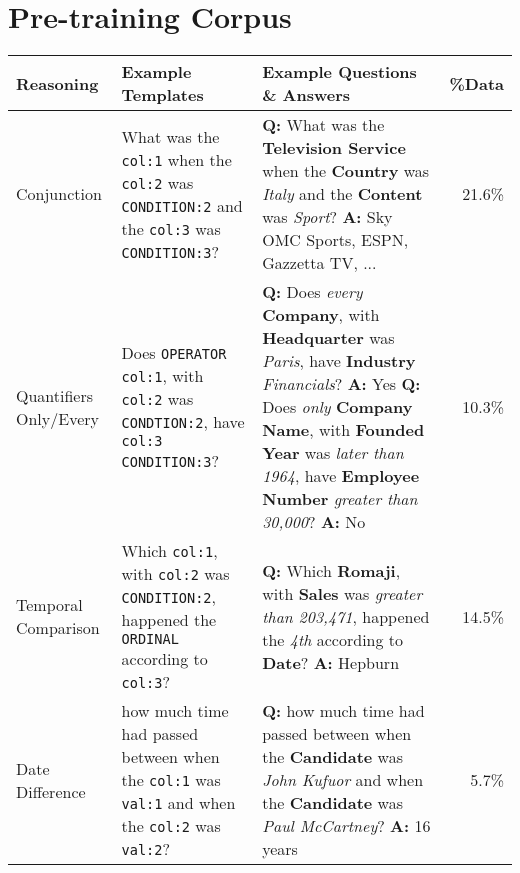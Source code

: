 \documentclass[11pt]{article}
\begin{document}
 \section{Pre-training Corpus}
\newcommand{\qm}{\text{\usefont{OT1}{iwona}{m}{n}?}}

\begin{table*}[!t]
\centering
\small
\begin{tabular}{p{1.4cm}p{5cm}p{6.3cm}r}
\toprule
\textbf{Reasoning}  & 
\textbf{Example Templates} & 
\textbf{Example Questions \& Answers} &
\textbf{\%Data} \\
\midrule
    Conjunction &
    What was the \texttt{col:1} when the \texttt{col:2} was \texttt{CONDITION:2} and the \texttt{col:3} was \texttt{CONDITION:3}? &
    \textbf{Q:} What was the \textbf{Television Service} when the \textbf{Country} was \textit{Italy} and the \textbf{Content} was \textit{Sport}? \newline
    \textbf{A:} Sky OMC Sports, ESPN, Gazzetta TV, ... &
21.6\%
    \\
    \midrule
    
    Quantifiers Only/Every &
    Does \texttt{OPERATOR} \texttt{col:1}, with \texttt{col:2} was \texttt{CONDTION:2}, have \texttt{col:3} \texttt{CONDITION:3}? &
    \textbf{Q:} Does \textit{every} \textbf{Company}, with \textbf{Headquarter} was \textit{Paris}, have \textbf{Industry} \textit{Financials}? \newline
    \textbf{A:} Yes \newline 
    \textbf{Q:} Does \textit{only} \textbf{Company Name}, with \textbf{Founded Year} was \textit{later than 1964}, have \textbf{Employee Number} \textit{greater than 30,000}? \newline
    \textbf{A:} No &
    10.3\%
    \\
    \midrule
    
    Temporal \newline Comparison &
    Which \texttt{col:1}, with \texttt{col:2} was \texttt{CONDITION:2}, happened the \texttt{ORDINAL} according to \texttt{col:3}? 
&
    \textbf{Q:} Which \textbf{Romaji}, with \textbf{Sales} was \textit{greater than 203,471}, happened the \textit{4th} according to \textbf{Date}? \newline 
    \textbf{A:} Hepburn
    &
    14.5\%
    \\
    \midrule
    
    Date \newline Difference & 
    how much time had passed between when the \texttt{col:1} was \texttt{val:1} and when the \texttt{col:2} was \texttt{val:2}? 
    &
    \textbf{Q:} how much time had passed between when the \textbf{Candidate} was \textit{John Kufuor} and when the \textbf{Candidate} was \textit{Paul McCartney}? \newline
    \textbf{A:} 16 years 
    &
    5.7\%
    \\
    \midrule
    

\end{tabular}
\end{table*}
\end{document}
